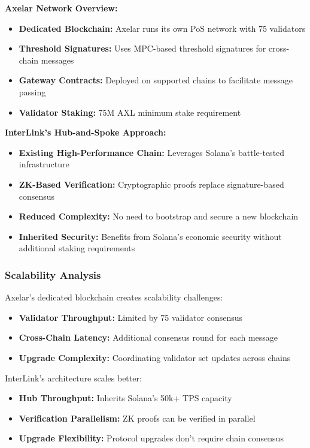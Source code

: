 \documentclass[11pt,a4paper]{article}
\begin{document}
\textbf{Axelar Network Overview:}
\begin{itemize}
    \item \textbf{Dedicated Blockchain:} Axelar runs its own PoS network with 75 validators
    \item \textbf{Threshold Signatures:} Uses MPC-based threshold signatures for cross-chain messages
    \item \textbf{Gateway Contracts:} Deployed on supported chains to facilitate message passing
    \item \textbf{Validator Staking:} 75M AXL minimum stake requirement
\end{itemize}

\textbf{InterLink's Hub-and-Spoke Approach:}
\begin{itemize}
    \item \textbf{Existing High-Performance Chain:} Leverages Solana's battle-tested infrastructure
    \item \textbf{ZK-Based Verification:} Cryptographic proofs replace signature-based consensus
    \item \textbf{Reduced Complexity:} No need to bootstrap and secure a new blockchain
    \item \textbf{Inherited Security:} Benefits from Solana's economic security without additional staking requirements
\end{itemize}

\subsubsection{Scalability Analysis}

Axelar's dedicated blockchain creates scalability challenges:
\begin{itemize}
    \item \textbf{Validator Throughput:} Limited by 75 validator consensus
    \item \textbf{Cross-Chain Latency:} Additional consensus round for each message
    \item \textbf{Upgrade Complexity:} Coordinating validator set updates across chains
\end{itemize}

InterLink's architecture scales better:
\begin{itemize}
    \item \textbf{Hub Throughput:} Inherits Solana's 50k+ TPS capacity
    \item \textbf{Verification Parallelism:} ZK proofs can be verified in parallel
    \item \textbf{Upgrade Flexibility:} Protocol upgrades don't require chain consensus
\end{itemize}
\end{document}
